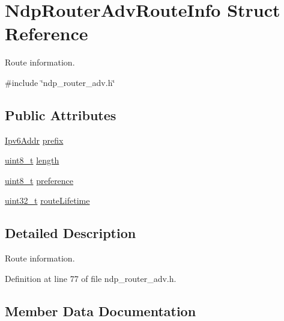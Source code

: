 \hypertarget{structNdpRouterAdvRouteInfo}{}\section{Ndp\+Router\+Adv\+Route\+Info Struct Reference}
\label{structNdpRouterAdvRouteInfo}


Route information.  




{\ttfamily \#include \char`\"{}ndp\+\_\+router\+\_\+adv.\+h\char`\"{}}

\subsection*{Public Attributes}
\begin{DoxyCompactItemize}
\item 
\hyperlink{ipv6_8h_aed0cbc40c61ed5b4fb681ebc55237e89}{Ipv6\+Addr} \hyperlink{structNdpRouterAdvRouteInfo_a5ceb6454b61cc24e72f1f147a046fccb}{prefix}
\item 
\hyperlink{stdint_8h_aba7bc1797add20fe3efdf37ced1182c5}{uint8\+\_\+t} \hyperlink{structNdpRouterAdvRouteInfo_a0ab1e43c52afaad78a0d1968fcbe4c15}{length}
\item 
\hyperlink{stdint_8h_aba7bc1797add20fe3efdf37ced1182c5}{uint8\+\_\+t} \hyperlink{structNdpRouterAdvRouteInfo_a9085c0a07401efb0628e5b6099f223b9}{preference}
\item 
\hyperlink{stdint_8h_a435d1572bf3f880d55459d9805097f62}{uint32\+\_\+t} \hyperlink{structNdpRouterAdvRouteInfo_a27a6fe937d7575dc7577d6d58890f4d6}{route\+Lifetime}
\end{DoxyCompactItemize}


\subsection{Detailed Description}
Route information. 

Definition at line 77 of file ndp\+\_\+router\+\_\+adv.\+h.



\subsection{Member Data Documentation}
\mbox{\label{structNdpRouterAdvRouteInfo_a0ab1e43c52afaad78a0d1968fcbe4c15}} 
